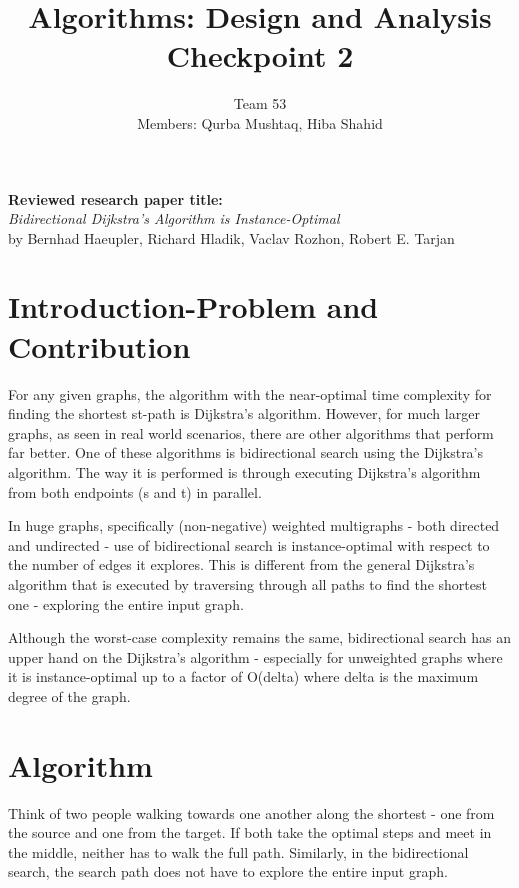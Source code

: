 \documentclass[12pt]{article}
\title{Algorithms: Design and Analysis \\ Checkpoint 2}
\author{
  Team 53 \\
  Members: Qurba Mushtaq, Hiba Shahid
}
\date{}
\begin{document}
\maketitle

\noindent\textbf{Reviewed research paper title:} \\
\textit{Bidirectional Dijkstra's Algorithm is Instance-Optimal} \\
by Bernhad Haeupler, Richard Hladik, Vaclav Rozhon, Robert E. Tarjan


\section*{Introduction-Problem and Contribution}
For any given graphs, the algorithm with the near-optimal time complexity for finding the shortest st-path is Dijkstra's algorithm. However, for much larger graphs, as seen in real world scenarios, there are other algorithms that perform far better. One of these algorithms is bidirectional search using the Dijkstra's algorithm. The way it is performed is through executing Dijkstra's algorithm from both endpoints (s and t) in parallel. 

In huge graphs, specifically (non-negative) weighted multigraphs - both directed and undirected - use of bidirectional search is instance-optimal with respect to the number of edges it explores. This is different from the general Dijkstra's algorithm that is executed by traversing through all paths to find the shortest one - exploring the entire input graph. 

Although the worst-case complexity remains the same, bidirectional search has an upper hand on the Dijkstra's algorithm - especially for unweighted graphs where it is instance-optimal up to a factor of O(delta) where delta is the maximum degree of the graph.

\section*{Algorithm}
Think of two people walking towards one another along the shortest - one from the source and one from the target. If both take the optimal steps and meet in the middle, neither has to walk the full path. Similarly, in the bidirectional search, the search path does not have to explore the entire input graph. 
\end{document}
